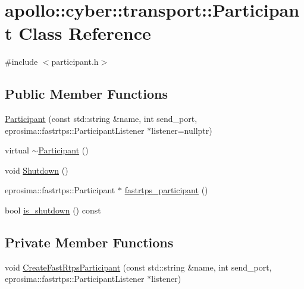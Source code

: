 \hypertarget{classapollo_1_1cyber_1_1transport_1_1Participant}{\section{apollo\-:\-:cyber\-:\-:transport\-:\-:Participant Class Reference}
\label{classapollo_1_1cyber_1_1transport_1_1Participant}
}


{\ttfamily \#include $<$participant.\-h$>$}

\subsection*{Public Member Functions}
\begin{DoxyCompactItemize}
\item 
\hyperlink{classapollo_1_1cyber_1_1transport_1_1Participant_a65fc1c33077f19a4255a9d3d77a03753}{Participant} (const std\-::string \&name, int send\-\_\-port, eprosima\-::fastrtps\-::\-Participant\-Listener $\ast$listener=nullptr)
\item 
virtual \hyperlink{classapollo_1_1cyber_1_1transport_1_1Participant_a5d75479a92e17008cb14d7e4db0addb0}{$\sim$\-Participant} ()
\item 
void \hyperlink{classapollo_1_1cyber_1_1transport_1_1Participant_ae794dca25344f7d22fc3b2ab2f12242e}{Shutdown} ()
\item 
eprosima\-::fastrtps\-::\-Participant $\ast$ \hyperlink{classapollo_1_1cyber_1_1transport_1_1Participant_a380d8eaf9b9f5d94d616fc89fc8bc81e}{fastrtps\-\_\-participant} ()
\item 
bool \hyperlink{classapollo_1_1cyber_1_1transport_1_1Participant_ac38b333e96db55e8aaf8aab51f2d55c8}{is\-\_\-shutdown} () const 
\end{DoxyCompactItemize}
\subsection*{Private Member Functions}
\begin{DoxyCompactItemize}
\item 
void \hyperlink{classapollo_1_1cyber_1_1transport_1_1Participant_a49b7ddbf6944ad9ba187bb14f79d6da2}{Create\-Fast\-Rtps\-Participant} (const std\-::string \&name, int send\-\_\-port, eprosima\-::fastrtps\-::\-Participant\-Listener $\ast$listener)
\end{DoxyCompactItemize}
